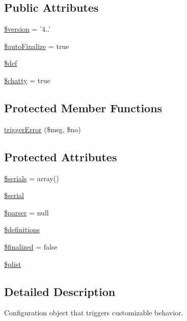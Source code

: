 \subsection*{Public Attributes}
\begin{DoxyCompactItemize}
\item 
\hyperlink{classHTMLPurifier__Config_a90113c09843f976f69f37031f7eb9023}{\$version} = '4..'
\item 
\hyperlink{classHTMLPurifier__Config_a951b10546b388ab4c6242931096aa97e}{\$auto\+Finalize} = true
\item 
\hyperlink{classHTMLPurifier__Config_aa76555df1991f670de3b1b3019929673}{\$def}
\item 
\hyperlink{classHTMLPurifier__Config_aba285c9cecc61c82b95bab05f8931539}{\$chatty} = true
\end{DoxyCompactItemize}
\subsection*{Protected Member Functions}
\begin{DoxyCompactItemize}
\item 
\hyperlink{classHTMLPurifier__Config_ab263fd9906646718fd19a24fcee646af}{trigger\+Error} (\$msg, \$no)
\end{DoxyCompactItemize}
\subsection*{Protected Attributes}
\begin{DoxyCompactItemize}
\item 
\hyperlink{classHTMLPurifier__Config_afe003339baa3446423bde92d230c1333}{\$serials} = array()
\item 
\hyperlink{classHTMLPurifier__Config_a69593d42c4c4f7a9c285ac2bf892fa15}{\$serial}
\item 
\hyperlink{classHTMLPurifier__Config_a4b3bfa5d185c17c911db346bbf1cfb49}{\$parser} = null
\item 
\hyperlink{classHTMLPurifier__Config_a744bb585ea736e15c14e308ce34a89cf}{\$definitions}
\item 
\hyperlink{classHTMLPurifier__Config_a6f4aab5c90546e30139d6c57657c7008}{\$finalized} = false
\item 
\hyperlink{classHTMLPurifier__Config_a11e37c608d947d71495b700b2e350e1c}{\$plist}
\end{DoxyCompactItemize}


\subsection{Detailed Description}
Configuration object that triggers customizable behavior.

